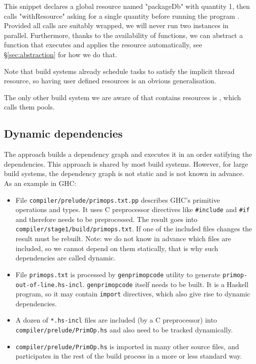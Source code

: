 This snippet declares a global resource named \lst"packageDb" with quantity 1,
then calls \lst"withResource" asking for a single quantity before running the
program . Provided all  calls are suitably wrapped,
we will never run two instances in parallel. Furthermore, thanks to the
availability of functions, we can abstract a function that executes
 and applies the resource automatically, see
\S\ref{sec:abstraction} for how we do that.

Note that build systems already schedule tasks to satisfy the implicit thread
resource, so having user defined resources is an obvious generalisation.

The only other build system we are aware of that contains resources is
, which calls them pools.

\subsection{Dynamic dependencies}

The \make{} approach builds a dependency graph and executes it in an order satifying the dependencies. This approach is shared by most build systems. However, for large build systems, the dependency graph is not static and is not known in advance. As an example in GHC:

\begin{itemize}
  \item File \texttt{compiler/prelude/primops.txt.pp} describes GHC's primitive
  operations and types. It uses C preprocessor directives like
  \texttt{\#include} and \texttt{\#if} and therefore needs to be preprocessed.
  The result goes into \texttt{compiler/stage1/build/primops.txt}. If one of the
  included files changes the result must be rebuilt. Note: we do not know in
  advance which files are included, so we cannot depend on them statically,
  that is why such dependencies are called dynamic.
  \item File \texttt{primops.txt} is processed by \texttt{genprimopcode} utility
  to generate \texttt{primop-out-of-line.hs-incl}. \texttt{genprimopcode} itself
  needs to be built. It is a Haskell program, so it may contain \texttt{import}
  directives, which also give rise to dynamic dependencies.
  \item A dozen of \texttt{*.hs-incl} files are included (by a C preprocessor)
  into \texttt{compiler/prelude/PrimOp.hs} and also need to be tracked
  dynamically.
  \item \texttt{compiler/prelude/PrimOp.hs} is imported in many other source
  files, and participates in the rest of the build process in a more or less
  standard way.
\end{itemize}

